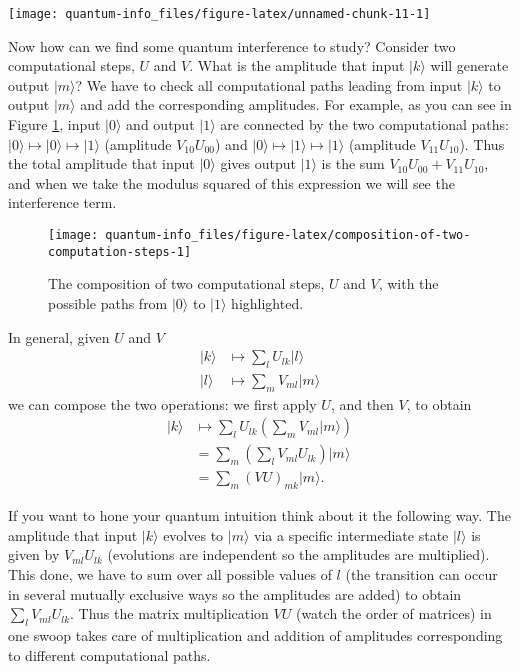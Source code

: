 \documentclass{article}
\begin{document}
\begin{center}\texttt{[image: quantum-info\_files/figure-latex/unnamed-chunk-11-1]} \end{center}

Now how can we find some quantum interference to study?
Consider two computational steps, \(U\) and \(V\).
What is the amplitude that input \(|k\rangle\) will generate output \(|m\rangle\)?
We have to check all computational paths leading from input \(|k\rangle\) to output \(|m\rangle\) and add the corresponding amplitudes.
For example, as you can see in Figure \ref{fig:composition-of-two-computation-steps}, input \(|0\rangle\) and output \(|1\rangle\) are connected by the two computational paths: \(|0\rangle\mapsto|0\rangle\mapsto|1\rangle\) (amplitude \(V_{10}U_{00}\)) and \(|0\rangle\mapsto|1\rangle\mapsto|1\rangle\) (amplitude \(V_{11}U_{10}\)).
Thus the total amplitude that input \(|0\rangle\) gives output \(|1\rangle\) is the sum \(V_{10}U_{00}+V_{11}U_{10}\), and when we take the modulus squared of this expression we will see the interference term.



\begin{figure}[H]

{\centering \texttt{[image: quantum-info\_files/figure-latex/composition-of-two-computation-steps-1]} 

}

\caption{The composition of two computational steps, \(U\) and \(V\), with the possible paths from \(|0\rangle\) to \(|1\rangle\) highlighted.}\label{fig:composition-of-two-computation-steps}
\end{figure}

In general, given \(U\) and \(V\)
\[
  \begin{aligned}
    |k\rangle
    &\mapsto
    \sum_l U_{lk}|l\rangle
  \\|l\rangle
    &\mapsto
    \sum_m V_{ml}|m\rangle
  \end{aligned}
\]
we can compose the two operations: we first apply \(U\), and then \(V\), to obtain
\[
  \begin{aligned}
    |k\rangle
    &\mapsto
    \sum_l U_{lk} \left(
      \sum_m V_{ml}|m\rangle
    \right)
  \\&=
    \sum_m \left(
      \sum_l V_{ml}U_{lk}
    \right) |m\rangle
  \\&=
    \sum_m (VU)_{mk} |m\rangle.
  \end{aligned}
\]

If you want to hone your quantum intuition think about it the following way.
The amplitude that input \(|k\rangle\) evolves to \(|m\rangle\) via a specific intermediate state \(|l\rangle\) is given by \(V_{ml}U_{lk}\) (evolutions are independent so the amplitudes are multiplied).
This done, we have to sum over all possible values of \(l\) (the transition can occur in several mutually exclusive ways so the amplitudes are added) to obtain \(\sum_l V_{ml}U_{lk}\).
Thus the matrix multiplication \(VU\) (watch the order of matrices) in one swoop takes care of multiplication and addition of amplitudes corresponding to different computational paths.
\end{document}

